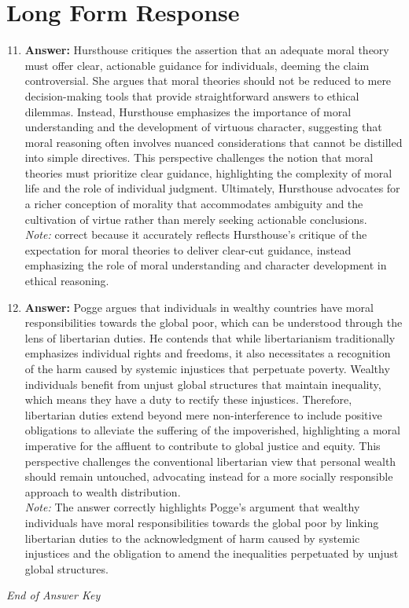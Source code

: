 \documentclass[12pt]{article}
\begin{document}
\section*{Long Form Response}
\begin{enumerate}[label=\arabic*.]
\setcounter{enumi}{10}
\item \textbf{Answer:} Hursthouse critiques the assertion that an adequate moral theory must offer clear, actionable guidance for individuals, deeming the claim controversial. She argues that moral theories should not be reduced to mere decision-making tools that provide straightforward answers to ethical dilemmas. Instead, Hursthouse emphasizes the importance of moral understanding and the development of virtuous character, suggesting that moral reasoning often involves nuanced considerations that cannot be distilled into simple directives. This perspective challenges the notion that moral theories must prioritize clear guidance, highlighting the complexity of moral life and the role of individual judgment. Ultimately, Hursthouse advocates for a richer conception of morality that accommodates ambiguity and the cultivation of virtue rather than merely seeking actionable conclusions.
\\ \textit{Note:} correct because it accurately reflects Hursthouse's critique of the expectation for moral theories to deliver clear-cut guidance, instead emphasizing the role of moral understanding and character development in ethical reasoning.
\item \textbf{Answer:} Pogge argues that individuals in wealthy countries have moral responsibilities towards the global poor, which can be understood through the lens of libertarian duties. He contends that while libertarianism traditionally emphasizes individual rights and freedoms, it also necessitates a recognition of the harm caused by systemic injustices that perpetuate poverty. Wealthy individuals benefit from unjust global structures that maintain inequality, which means they have a duty to rectify these injustices. Therefore, libertarian duties extend beyond mere non-interference to include positive obligations to alleviate the suffering of the impoverished, highlighting a moral imperative for the affluent to contribute to global justice and equity. This perspective challenges the conventional libertarian view that personal wealth should remain untouched, advocating instead for a more socially responsible approach to wealth distribution.
\\ \textit{Note:} The answer correctly highlights Pogge's argument that wealthy individuals have moral responsibilities towards the global poor by linking libertarian duties to the acknowledgment of harm caused by systemic injustices and the obligation to amend the inequalities perpetuated by unjust global structures.
\end{enumerate}

\vfill
\noindent\textit{End of Answer Key}
\end{document}
